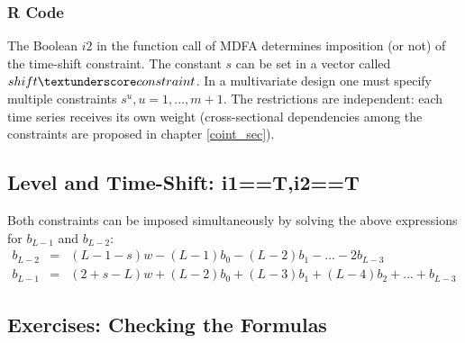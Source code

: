 \documentclass[a4paper]{book}
\begin{document}
\subsubsection{R Code}

The Boolean $i2$ in the function call of MDFA determines imposition (or not) of the time-shift constraint. The constant $s$ can be set in a vector called $shift\textunderscore constraint$. In a multivariate design one must specify multiple constraints $s^u, u=1,...,m+1$. The restrictions are independent: each time series receives its own weight (cross-sectional dependencies among the constraints are proposed in chapter \ref{coint_sec}).



\subsection{Level and Time-Shift: i1==T,i2==T}

Both constraints can be imposed simultaneously by solving the above expressions for $b_{L-1}$ and $b_{L-2}$:
\begin{eqnarray}\label{cons2}
b_{L-2}&=&(L-1-s)w-(L-1)b_0-(L-2)b_1-...-2b_{L-3}\label{cons2}\\
b_{L-1}&=&(2+s-L)w+(L-2)b_0+(L-3)b_1+(L-4)b_2+...+b_{L-3}\label{cons3}
\end{eqnarray}

\subsection{Exercises: Checking the Formulas}
\end{document}
